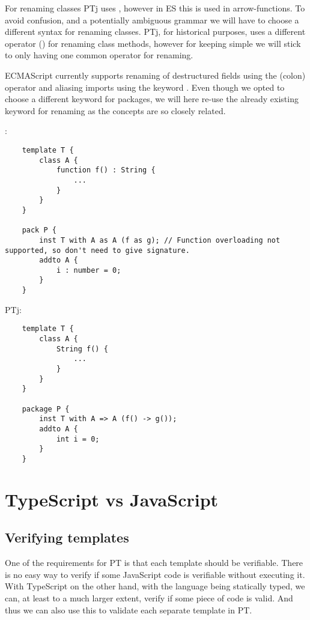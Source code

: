 For renaming classes PTj uses \codeword{=>}, however in ES this is used in arrow-functions\cite{arrowfunction}.
To avoid confusion, and a potentially ambiguous grammar we will have to choose a different syntax for renaming classes.
PTj, for historical purposes, uses a different operator (\codeword{->}) for renaming class methods, however for keeping \plname{} simple we will stick to only having one common operator for renaming.

ECMAScript currently supports renaming of destructured fields using the \codeword{:}(colon) operator and aliasing imports using the keyword .
Even though we opted to choose a different keyword for packages, we will here re-use the already existing  keyword for renaming as the concepts are so closely related.

\plname{}:
\begin{lstlisting}
    template T {
        class A {
            function f() : String {
                ...
            }
        }
    }

    pack P {
        inst T with A as A (f as g); // Function overloading not supported, so don't need to give signature.
        addto A {
            i : number = 0;
        }
    }
\end{lstlisting}

PTj:
\begin{lstlisting}
    template T {
        class A {
            String f() {
                ...
            }
        }
    }

    package P {
        inst T with A => A (f() -> g()); 
        addto A {
            int i = 0;
        }
    }
\end{lstlisting}



\section{TypeScript vs JavaScript}\label{sec:typescript-vs-javascript}

\subsection{Verifying templates}\label{subsec:why-typescript-verifying-templates}

One of the requirements for PT is that each template should be verifiable.
There is no easy way to verify if some JavaScript code is verifiable without executing it.
With TypeScript on the other hand, with the language being statically typed, we can, at least to a much larger extent, verify if some piece of code is valid.
And thus we can also use this to validate each separate template in PT.

